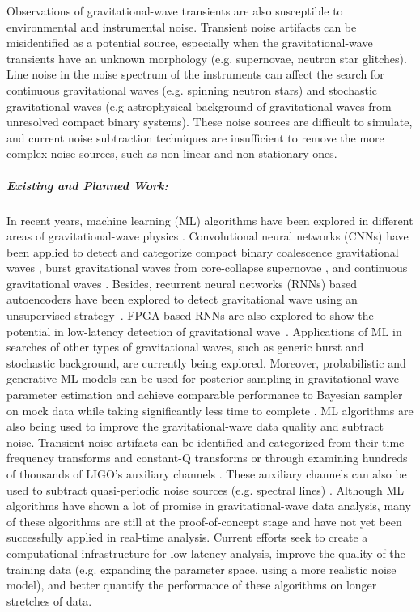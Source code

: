         Observations of gravitational-wave transients are also susceptible to environmental and instrumental noise.
        Transient noise artifacts can be misidentified as a potential source, especially when the gravitational-wave transients have an unknown morphology (e.g. supernovae, neutron star glitches).
        Line noise in the noise spectrum of the instruments can affect the search for  continuous gravitational waves (e.g. spinning neutron stars) and stochastic gravitational waves (e.g astrophysical background of gravitational waves from unresolved compact binary systems).
        These noise sources are difficult to simulate, and current noise subtraction techniques are insufficient to remove the more complex noise sources, such as non-linear and non-stationary ones. 

\subparagraph*{Existing and Planned Work:}
        In recent years, machine learning (ML) algorithms have been explored in different areas of gravitational-wave physics \cite{Cuoco_2020}.
        Convolutional neural networks (CNNs) have been applied to detect and categorize compact binary coalescence gravitational waves \cite{PhysRevLett.120.141103, Kim_2015, PhysRevD.101.083006, George_2018, Gebhard_2019}, burst gravitational waves from core-collapse supernovae \cite{Astone_2018, Chan_2020, Iess_2020}, and continuous gravitational waves \cite{Dreissigacker_2019, Beheshtipour_2020}.
        Besides, recurrent neural networks (RNNs) based autoencoders have been explored to detect gravitational wave using an unsupervised strategy~\cite{moreno2021source}. FPGA-based RNNs are also explored to show the potential in low-latency detection of gravitational wave~\cite{que2021accelerating}.
        Applications of ML in searches of other types of gravitational waves, such as generic burst and stochastic background, are currently being explored.
        Moreover, probabilistic and generative ML models can be used for posterior sampling in gravitational-wave parameter estimation and achieve comparable performance to Bayesian sampler on mock data while taking significantly less time to complete \cite{shen2019deterministic, gabbard2020bayesian,  PhysRevLett.124.041102}.
        ML algorithms are also being used to improve the gravitational-wave data quality and subtract noise.
        Transient noise artifacts can be identified and categorized from their time-frequency transforms and constant-Q transforms \cite{Zevin_2017, Razzano_2018} or through examining hundreds of thousands of LIGO's auxiliary channels \cite{iDQ2013}.
        These auxiliary channels can also be used to subtract quasi-periodic noise sources (e.g. spectral lines) \cite{PhysRevD.101.042003, Ormiston_2020}.
        Although ML algorithms have shown a lot of promise in gravitational-wave data analysis, many of these algorithms are still at the proof-of-concept stage and have not yet been successfully applied in real-time analysis.
        Current efforts seek to create a computational infrastructure for low-latency analysis, improve the quality of the training data (e.g. expanding the parameter space, using a more realistic noise model), and better quantify the performance of these algorithms on longer stretches of data.

